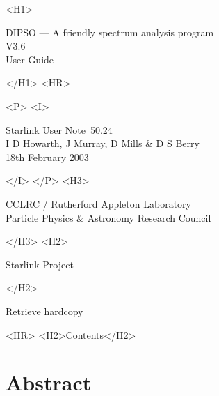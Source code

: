 \documentclass[twoside,11pt]{article}
\newcommand{\stardoccategory}  {Starlink User Note}
\newcommand{\stardocsource}    {sun\stardocnumber}
\newcommand{\stardocnumber} {50.24}
\newcommand{\stardocauthors} {I D Howarth, J Murray, D Mills \& D S Berry}
\newcommand{\stardocdate} {18th February 2003}
\newcommand{\stardoctitle} {DIPSO --- A friendly spectrum analysis program}
\newcommand{\stardocversion}   {V3.6}
\newcommand{\stardocmanual}    {User Guide}
\newcommand{\htmladdnormallink}[2]{#1}
\newcommand{\htmladdimg}[1]{}
\newcommand{\htmlref}[2]{#1}
\newcommand{\htmladdtonavigation}[1]{}
\newcommand{\xlabel}[1]{}
\renewcommand{\_}{\texttt{\symbol{95}}}
\begin{document}
\begin{htmlonly}
   \xlabel{}
   \begin{rawhtml} <H1> \end{rawhtml}
      \stardoctitle\\
      \stardocversion\\
      \stardocmanual
   \begin{rawhtml} </H1> <HR> \end{rawhtml}


   \begin{rawhtml} <P> <I> \end{rawhtml}
   \stardoccategory\ \stardocnumber \\
   \stardocauthors \\
   \stardocdate
   \begin{rawhtml} </I> </P> <H3> \end{rawhtml}
      \htmladdnormallink{CCLRC / Rutherford Appleton Laboratory}
                        {http://www.cclrc.ac.uk} \\
      \htmladdnormallink{Particle Physics \& Astronomy Research Council}
                        {http://www.pparc.ac.uk} \\
   \begin{rawhtml} </H3> <H2> \end{rawhtml}
      \htmladdnormallink{Starlink Project}{http://www.starlink.rl.ac.uk/}
   \begin{rawhtml} </H2> \end{rawhtml}
   \htmladdnormallink{\htmladdimg{source.gif} Retrieve hardcopy}
      {http://www.starlink.rl.ac.uk/cgi-bin/hcserver?\stardocsource}\\

  \label{stardoccontents}
  \begin{rawhtml} 
    <HR>
    <H2>Contents</H2>
  \end{rawhtml}
  \htmladdtonavigation{\htmlref{\htmladdimg{contents_motif.gif}}
        {stardoccontents}}

  \section{\xlabel{abstract}Abstract}
\end{htmlonly}
\end{document}
